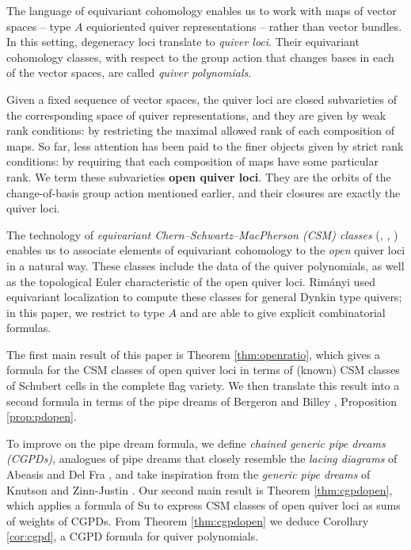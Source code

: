 \documentclass[reqno]{amsart}
\numberwithin{equation}{section}
\theoremstyle{definition}
\theoremstyle{remark}
\begin{document}
The language of equivariant cohomology enables us to work with maps of vector spaces -- type $A$ equioriented quiver representations -- rather than vector bundles. In this setting, degeneracy loci translate to \textit{quiver loci}. Their equivariant cohomology classes, with respect to the group action that changes bases in each of the vector spaces, are called \textit{quiver polynomials}. %

Given a fixed sequence of vector spaces, the quiver loci are closed subvarieties of the corresponding space of quiver representations, and they are given by weak rank conditions: by restricting the maximal allowed rank of each composition of maps. So far, less attention has been paid to the finer objects given by strict rank conditions: by requiring that each composition of maps have some particular rank. We term these subvarieties \textbf{open quiver loci}. They are the orbits of the change-of-basis group action mentioned earlier, and their closures are exactly the quiver loci.

The technology of \textit{equivariant Chern--Schwartz--MacPherson (CSM) classes} (\cite{DG}, \cite{Mac74}, \cite{ohm06}) enables us to associate elements of equivariant cohomology to the \emph{open} quiver loci in a natural way. These classes include the data of the quiver polynomials, as well as the topological Euler characteristic of the open quiver loci. Rim{\'a}nyi \cite{R20} used equivariant localization to compute these classes for general Dynkin type quivers; in this paper, we restrict to type $A$ and are able to give explicit combinatorial formulas.

The first main result of this paper is Theorem \ref{thm:openratio}, which gives a formula for the CSM classes of open quiver loci in terms of (known) CSM classes of Schubert cells in the complete flag variety. We then translate this result into a second formula in terms of the pipe dreams of Bergeron and Billey \cite{BB93}, Proposition \ref{prop:pdopen}.

To improve on the pipe dream formula, we define \textit{chained generic pipe dreams (CGPDs)}, analogues of pipe dreams that closely resemble the \textit{lacing diagrams} of Abeasis and Del Fra \cite{AD85}, and take inspiration from the \textit{generic pipe dreams} of Knutson and Zinn-Justin \cite{kzj25}. Our second main result is Theorem \ref{thm:cgpdopen}, which applies a formula of Su \cite{csu} to express CSM classes of open quiver loci as sums of weights of CGPDs. From Theorem \ref{thm:cgpdopen} we deduce Corollary \ref{cor:cgpd}, a CGPD formula for quiver polynomials.\\
\end{document}
